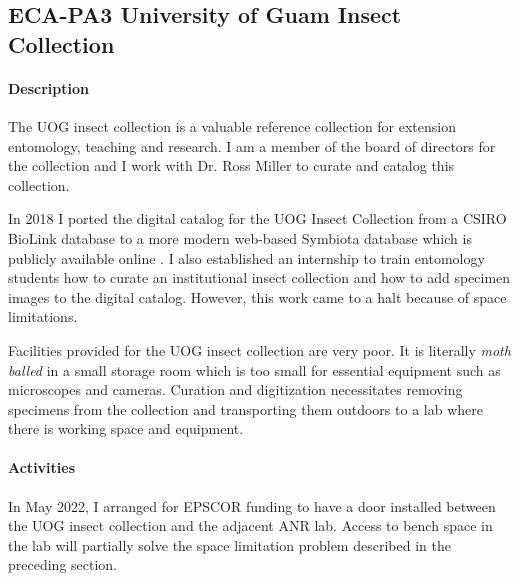 \subsection{ECA-PA3 University of Guam Insect Collection}
\begin{refsection}
	
\paragraph{Description}

The UOG insect collection is a valuable reference collection for extension
entomology, teaching and research. I am a member of the board of directors
for the collection and I work with Dr. Ross Miller to curate and catalog
this collection.

In 2018 I ported the digital catalog for the UOG Insect Collection from a
CSIRO BioLink database to a more modern web-based Symbiota database
which is publicly available online \cite{moore_scan_2018}. I also established an internship to train entomology students how to curate an institutional insect collection and how to add specimen images to the digital catalog\cite{moore_internship_2018}. However, this work came to a halt because of space limitations. 

Facilities provided for the UOG insect collection are very poor. It is literally \textit{moth balled} in a small storage room which is too small for essential equipment such as microscopes and cameras. Curation and digitization necessitates removing specimens from the collection and transporting them outdoors to a lab where there is working space and equipment.

\paragraph{Activities}

In May 2022, I arranged for EPSCOR funding to have a door installed between the UOG insect collection and the adjacent ANR lab. Access to bench space in the lab will partially solve the space limitation problem described in the preceding section. 
\begin{comment}
\paragraph{Plans for 15JUN2021-14JUN2022}

I plan to request installation of a door between the UOG insect collection room and the adjacent ANR lab so that lab space, microscopes and cameras are available for working with specimens 


\end{comment}
\end{refsection}
